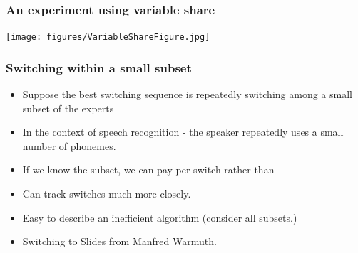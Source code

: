 \documentclass[handout]{beamer}
\begin{document}
\begin{frame}
\frametitle{An experiment using variable share}
\texttt{[image: figures/VariableShareFigure.jpg]}
\end{frame}

\begin{frame}
\frametitle{Switching within a small subset}
\begin{itemize}
\item Suppose the best switching sequence is repeatedly switching among a small subset of the experts
\item In the context of speech recognition - the speaker repeatedly uses a small number of phonemes.
\item If we know the subset, we can pay  per switch rather than 
\item Can track switches much more closely.
\item Easy to describe an inefficient algorithm (consider all  subsets.)
\item Switching to Slides from Manfred Warmuth.
\end{itemize}
\end{frame}

%
\end{document}

